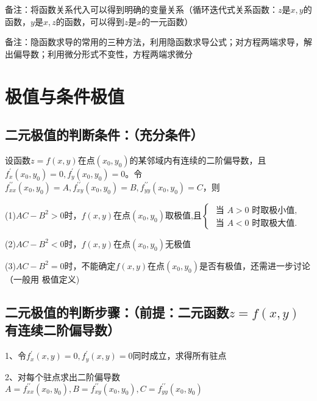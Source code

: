 备注：将函数关系代入可以得到明确的变量关系（循环迭代式关系函数：$z$是$x,y$的函数，$y$是$x,z$的函数，可以得到$z$是$x$的一元函数）

备注：隐函数求导的常用的三种方法，利用隐函数求导公式；对方程两端求导，解出偏导数；利用微分形式不变性，方程两端求微分

\section{极值与条件极值}



\subsection{二元极值的判断条件：（充分条件）}

设函数$z=f(x, y)$在点$\left(x_{0}, y_{0}\right)$的某邻域内有连续的二阶偏导数，且$f_{x}^{\prime}\left(x_{0}, y_{0}\right)=0, f_{y}^{\prime}\left(x_{0}, y_{0}\right)=0$。令$f_{x x}^{\prime \prime}\left(x_{0}, y_{0}\right)=A, f_{x y}^{\prime \prime}\left(x_{0}, y_{0}\right)=B, f_{y y}^{\prime \prime}\left(x_{0}, y_{0}\right)=C$，则

(1)$A C-B^{2}>0$时，$f(x, y)$在点$\left(x_{0}, y_{0}\right)$取极值,且$\left\{\begin{array}{l}\text { 当 } A>0 \text { 时取极小值, } \\ \text { 当 } A<0 \text { 时取极大值. }\end{array}\right.$

(2)$A C-B^{2}<0$时，$f(x, y)$在点$\left(x_{0}, y_{0}\right)$无极值

(3)$A C-B^{2}=0$时，不能确定$f(x, y)$在点$\left(x_{0}, y_{0}\right)$是否有极值，还需进一步讨论（一般用 极值定义)



\subsection{二元极值的判断步骤：（前提：二元函数$z=f(x, y)$有连续二阶偏导数）}

1、令$f_{x}^{\prime}(x, y)=0, f_{y}^{\prime}(x, y)=0$同时成立，求得所有驻点

2、对每个驻点求出二阶偏导数$A=f_{x x}^{\prime \prime}\left(x_{0}, y_{0}\right), B=f_{x y}^{\prime \prime}\left(x_{0}, y_{0}\right), C=f_{y y}^{\prime \prime}\left(x_{0}, y_{0}\right)$

